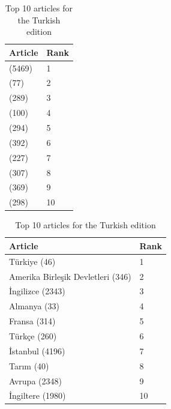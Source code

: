 \begin{table}[htbp]
    \begin{minipage}{.45\linewidth}
        \centering
        \begin{tabular}{ll}
            \toprule
            Article & Rank\\
            \midrule
            (5469) & 1\\
            (77) & 2\\
            (289) & 3\\
            (100) & 4\\
            (294) & 5\\
            (392) & 6\\
            (227) & 7\\
            (307) & 8\\
            (369) & 9\\
            (298) & 10\\
            \bottomrule
        \end{tabular}
        \caption{Top 10 articles for the Thai edition}
    \end{minipage}
    \hfill
    \begin{minipage}{.45\linewidth}
        \centering
        \begin{tabular}{ll}
            \toprule
            Article & Rank\\
            \midrule
            Türkiye (46) & 1\\
            Amerika Birleşik Devletleri (346) & 2\\
            İngilizce (2343) & 3\\
            Almanya (33) & 4\\
            Fransa (314) & 5\\
            Türkçe (260) & 6\\
            İstanbul (4196) & 7\\
            Tarım (40) & 8\\
            Avrupa (2348) & 9\\
            İngiltere (1980) & 10\\
            \bottomrule
        \end{tabular}
        \caption{Top 10 articles for the Turkish edition}
    \end{minipage}
\end{table}
